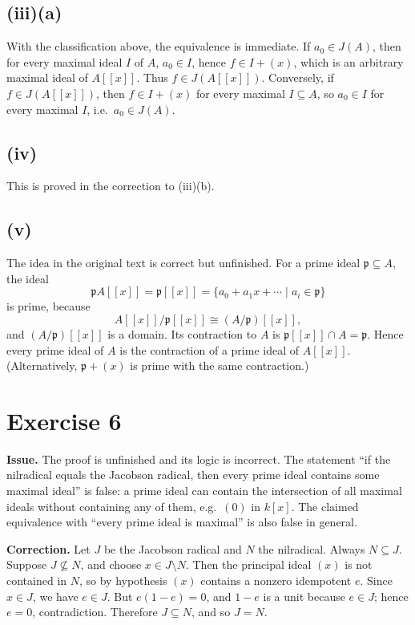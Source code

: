 \documentclass[11pt]{article}
\newcommand{\fp}{\mathfrak p}
\begin{document}
\subsection*{(iii)(a)}
With the classification above, the equivalence is immediate.  If
\(a_0\in J(A)\), then for every maximal ideal \(I\) of \(A\),
\(a_0\in I\), hence \(f\in I+(x)\), which is an arbitrary maximal ideal of
\(A[[x]]\).  Thus \(f\in J(A[[x]])\).  Conversely, if
\(f\in J(A[[x]])\), then \(f\in I+(x)\) for every maximal \(I\subseteq A\),
so \(a_0\in I\) for every maximal \(I\), i.e.\ \(a_0\in J(A)\).

\subsection*{(iv)}
This is proved in the correction to (iii)(b).

\subsection*{(v)}
The idea in the original text is correct but unfinished.  For a prime ideal
\(\fp\subseteq A\), the ideal
\[
\fp A[[x]]=\fp[[x]]=\{a_0+a_1x+\cdots\mid a_i\in\fp\}
\]
is prime, because
\[
A[[x]]/\fp[[x]]\cong(A/\fp)[[x]],
\]
and \((A/\fp)[[x]]\) is a domain.  Its contraction to \(A\) is
\(\fp[[x]]\cap A=\fp\).  Hence every prime ideal of \(A\) is the contraction
of a prime ideal of \(A[[x]]\).  (Alternatively, \(\fp+(x)\) is prime with the
same contraction.)

\section*{Exercise 6}

\textbf{Issue.}  The proof is unfinished and its logic is incorrect.  The
statement ``if the nilradical equals the Jacobson radical, then every prime
ideal contains some maximal ideal'' is false: a prime ideal can contain the
intersection of all maximal ideals without containing any of them, e.g.\
\((0)\) in \(k[x]\).  The claimed equivalence with ``every prime ideal is
maximal'' is also false in general.

\textbf{Correction.}  Let \(J\) be the Jacobson radical and \(N\) the
nilradical.  Always \(N\subseteq J\).  Suppose \(J\not\subseteq N\), and choose
\(x\in J\setminus N\).  Then the principal ideal \((x)\) is not contained in
\(N\), so by hypothesis \((x)\) contains a nonzero idempotent \(e\).  Since
\(x\in J\), we have \(e\in J\).  But \(e(1-e)=0\), and \(1-e\) is a unit
because \(e\in J\); hence \(e=0\), contradiction.  Therefore
\(J\subseteq N\), and so \(J=N\).
\end{document}
